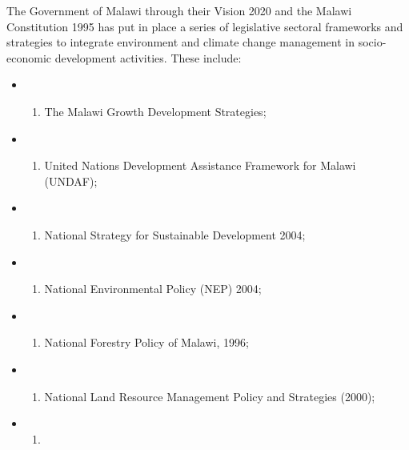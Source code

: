 \documentclass[
]{book}
\providecommand{\tightlist}{%
  \setlength{\itemsep}{0pt}\setlength{\parskip}{0pt}}
\begin{document}
The Government of Malawi through their Vision 2020 and the Malawi Constitution 1995 has put in place a series of legislative sectoral frameworks and strategies
to integrate environment and climate change management in socio-economic development activities. These include:

\begin{itemize}
\item
  \begin{enumerate}
  \def\labelenumi{\roman{enumi}.}
  \tightlist
  \item
    The Malawi Growth Development Strategies;
  \end{enumerate}
\item
  \begin{enumerate}
  \def\labelenumi{\roman{enumi}.}
  \setcounter{enumi}{1}
  \tightlist
  \item
    United Nations Development Assistance Framework for Malawi (UNDAF);
  \end{enumerate}
\item
  \begin{enumerate}
  \def\labelenumi{\roman{enumi}.}
  \setcounter{enumi}{2}
  \tightlist
  \item
    National Strategy for Sustainable Development 2004;
  \end{enumerate}
\item
  \begin{enumerate}
  \def\labelenumi{\roman{enumi}.}
  \setcounter{enumi}{3}
  \tightlist
  \item
    National Environmental Policy (NEP) 2004;
  \end{enumerate}
\item
  \begin{enumerate}
  \def\labelenumi{\alph{enumi}.}
  \setcounter{enumi}{21}
  \tightlist
  \item
    National Forestry Policy of Malawi, 1996;
  \end{enumerate}
\item
  \begin{enumerate}
  \def\labelenumi{\roman{enumi}.}
  \setcounter{enumi}{5}
  \tightlist
  \item
    National Land Resource Management Policy and Strategies (2000);
  \end{enumerate}
\item
  \begin{enumerate}
  \def\labelenumi{\roman{enumi}.}
  \setcounter{enumi}{6}
  \tightlist
  \item

\end{enumerate}
\end{itemize}
\end{document}
